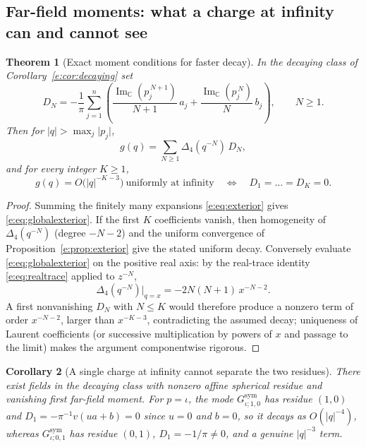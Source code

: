 \documentclass[11pt,a4paper]{article}
\numberwithin{equation}{section}
\newtheorem{theorem}{Theorem}[section]
\newtheorem{corollary}[theorem]{Corollary}
\theoremstyle{definition}
\theoremstyle{remark}
\theoremstyle{plain}
\newcommand{\CC}{\mathbb C}
\DeclareMathOperator{\Ima}{Im}
\newcommand{\lap}{\Delta_4}
\newcommand{\abs}[1]{\lvert #1\rvert}
\begin{document}
\subsection{Far-field moments: what a charge at infinity can and cannot
see}
\label{e:sec:farfield}

\begin{theorem}[Exact moment conditions for faster decay]
\label{e:thm:moments}
In the decaying class of Corollary~\ref{e:cor:decaying} set
\begin{equation}
 D_N=-\frac1\pi\sum_{j=1}^{n}\left(
    \frac{\Ima_{\CC}(p_j^{\,N+1})}{N+1}\,a_j
   +\frac{\Ima_{\CC}(p_j^{\,N})}{N}\,b_j\right),\qquad N\ge1 .
 \label{e:eq:globalmoments}
\end{equation}
Then for $\abs q>\max_j\abs{p_j}$,
\begin{equation}
 g(q)=\sum_{N\ge1}\lap(q^{-N})\,D_N ,
 \label{e:eq:globalexterior}
\end{equation}
and for every integer $K\ge1$,
\begin{equation}
 g(q)=O\bigl(\abs q^{-K-3}\bigr)\ \text{uniformly at infinity}
 \quad\Longleftrightarrow\quad
 D_1=\dots=D_K=0 .
 \label{e:eq:momentequivalence}
\end{equation}
\end{theorem}

\begin{proof}
Summing the finitely many expansions \eqref{e:eq:exterior} gives
\eqref{e:eq:globalexterior}. If the first $K$ coefficients vanish, then
homogeneity of $\lap(q^{-N})$ (degree $-N-2$) and the uniform
convergence of Proposition~\ref{e:prop:exterior} give the stated uniform
decay. Conversely evaluate \eqref{e:eq:globalexterior} on the positive
real axis: by the real-trace identity \eqref{e:eq:realtrace} applied to
$z^{-N}$,
\[
 \lap(q^{-N})\big|_{q=x}=-2N(N+1)\,x^{-N-2}.
\]
A first nonvanishing $D_N$ with $N\le K$ would therefore produce a
nonzero term of order $x^{-N-2}$, larger than $x^{-K-3}$, contradicting
the assumed decay; uniqueness of Laurent coefficients (or successive
multiplication by powers of $x$ and passage to the limit) makes the
argument componentwise rigorous.
\end{proof}

\begin{corollary}[A single charge at infinity cannot separate the two
residues]
\label{e:cor:chargeinfinity}
There exist fields in the decaying class with nonzero affine spherical
residue and vanishing first far-field moment. For $p=\iota$, the mode
$G^{\mathrm{sym}}_{\iota;1,0}$ has residue $(1,0)$ and
$D_1=-\pi^{-1}v(ua+b)=0$ since $u=0$ and $b=0$, so it decays as
$O(\abs q^{-4})$, whereas $G^{\mathrm{sym}}_{\iota;0,1}$ has residue
$(0,1)$, $D_1=-1/\pi\ne0$, and a genuine $\abs q^{-3}$ term.
\end{corollary}
\end{document}
